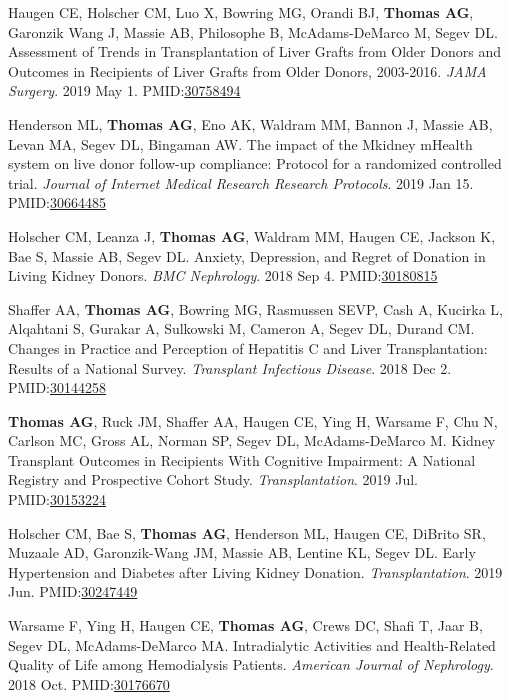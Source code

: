 \documentclass[10pt]{article}
\makeatletter
\newlength{\bibhang}
\newlength{\bibsep}
 {\@listi \global\bibsep\itemsep \global\advance\bibsep by\parsep}
\newenvironment{bibenum*}
  {\renewcommand\labelenumi{[\theenumi]}%
   \etaremune[
     topsep=0pt,
     itemsep=\bibsep,
     parsep=0pt,partopsep=0pt,
     itemindent=-\bibhang,
     leftmargin={\bibhang+\widthof{[999]}}]}
  {\endetaremune}
\newcommand{\pmid}[1]{PMID:\href{https://www.ncbi.nlm.nih.gov/pubmed/#1}{#1}}
\makeatother
\begin{document}
\begin{bibenum*}
\item Haugen CE, Holscher CM, Luo X, Bowring MG, Orandi BJ, \textbf{Thomas AG},
  Garonzik Wang J, Massie AB, Philosophe B, McAdams-DeMarco M, Segev DL.
  Assessment of Trends in Transplantation of Liver Grafts from Older Donors
  and Outcomes in Recipients of Liver Grafts from Older Donors, 2003-2016.
  \emph{JAMA Surgery}. 2019 May 1.
  \pmid{30758494} 

\item Henderson ML, \textbf{Thomas AG}, Eno AK, Waldram MM, Bannon J,
  Massie AB, Levan MA, Segev DL, Bingaman AW.
  The impact of the Mkidney mHealth system on live donor
  follow-up compliance: Protocol for a randomized controlled trial.
  \emph{Journal of Internet Medical Research Research Protocols}. 2019 Jan 15.
  \pmid{30664485} 

\item Holscher CM, Leanza J, \textbf{Thomas AG}, Waldram MM, Haugen CE,
  Jackson K, Bae S, Massie AB, Segev DL. 
  Anxiety, Depression, and
  Regret of Donation in Living Kidney Donors.
  \emph{BMC Nephrology}. 2018 Sep 4.
  \pmid{30180815} 

\item Shaffer AA, \textbf{Thomas AG}, Bowring MG, Rasmussen SEVP,
  Cash A, Kucirka L, Alqahtani S, Gurakar A, Sulkowski M, Cameron A,
  Segev DL, Durand CM. Changes in Practice and Perception of Hepatitis
  C and Liver Transplantation: Results of a National Survey.
  \emph{Transplant Infectious Disease}. 2018 Dec 2.
  \pmid{30144258} 

\item \textbf{Thomas AG\dag}, Ruck JM\dag, Shaffer AA, Haugen CE, Ying H,
  Warsame F, Chu N, Carlson MC, Gross AL,
  Norman SP, Segev DL, McAdams-DeMarco M.
  Kidney Transplant Outcomes in Recipients With Cognitive Impairment: 
  A National Registry and Prospective Cohort Study.
  \emph{Transplantation}. 2019 Jul.
  \pmid{30153224} 

\item Holscher CM, Bae S, \textbf{Thomas AG}, Henderson ML, Haugen CE,
  DiBrito SR, Muzaale AD, Garonzik-Wang JM, Massie AB, Lentine KL, Segev DL.
  Early Hypertension and Diabetes after Living Kidney Donation.
  \emph{Transplantation}. 2019 Jun.
  \pmid{30247449} 

\item Warsame F, Ying H, Haugen CE, \textbf{Thomas AG}, Crews DC, Shafi T,
  Jaar B, Segev DL, McAdams-DeMarco MA. Intradialytic Activities and
  Health-Related Quality of Life among Hemodialysis Patients.
  \emph{American Journal of Nephrology}. 2018 Oct.
  \pmid{30176670} 


\end{bibenum*}
\end{document}
